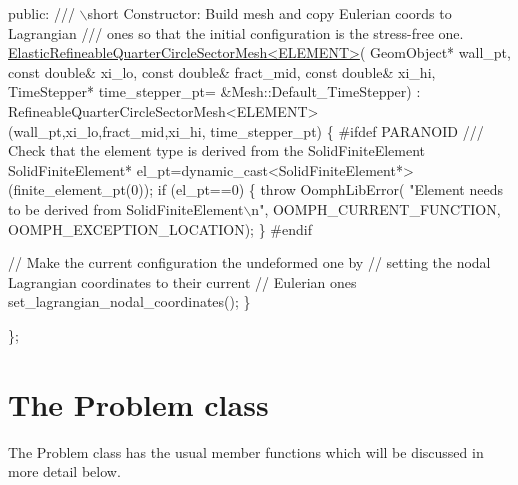 \begin{DoxyCodeInclude}


\textcolor{keyword}{public}:
\textcolor{comment}{}
\textcolor{comment}{ /// \(\backslash\)short Constructor: Build mesh and copy Eulerian coords to Lagrangian}
\textcolor{comment}{ /// ones so that the initial configuration is the stress-free one.}
\textcolor{comment}{} \hyperlink{classElasticRefineableQuarterCircleSectorMesh}{ElasticRefineableQuarterCircleSectorMesh<ELEMENT>}(
      GeomObject* wall\_pt,
                                         \textcolor{keyword}{const} \textcolor{keywordtype}{double}& xi\_lo,
                                         \textcolor{keyword}{const} \textcolor{keywordtype}{double}& fract\_mid,
                                         \textcolor{keyword}{const} \textcolor{keywordtype}{double}& xi\_hi,
                                         TimeStepper* time\_stepper\_pt=
                                         &Mesh::Default\_TimeStepper) :
  RefineableQuarterCircleSectorMesh<ELEMENT>(wall\_pt,xi\_lo,fract\_mid,xi\_hi,
                                             time\_stepper\_pt)
  \{
\textcolor{preprocessor}{#ifdef PARANOID}
\textcolor{comment}{   /// Check that the element type is derived from the SolidFiniteElement}
\textcolor{comment}{}   SolidFiniteElement* el\_pt=\textcolor{keyword}{dynamic\_cast<}SolidFiniteElement*\textcolor{keyword}{>}
    (finite\_element\_pt(0));
   \textcolor{keywordflow}{if} (el\_pt==0)
    \{
     \textcolor{keywordflow}{throw} OomphLibError(
      \textcolor{stringliteral}{"Element needs to be derived from SolidFiniteElement\(\backslash\)n"},
      OOMPH\_CURRENT\_FUNCTION,
      OOMPH\_EXCEPTION\_LOCATION);
    \}
\textcolor{preprocessor}{#endif}

   \textcolor{comment}{// Make the current configuration the undeformed one by}
   \textcolor{comment}{// setting the nodal Lagrangian coordinates to their current}
   \textcolor{comment}{// Eulerian ones}
   set\_lagrangian\_nodal\_coordinates();
  \}

\};

\end{DoxyCodeInclude}




 

\hypertarget{index_problem_class}{}\section{The Problem class}\label{index_problem_class}
The {\ttfamily Problem} class has the usual member functions which will be discussed in more detail below.

